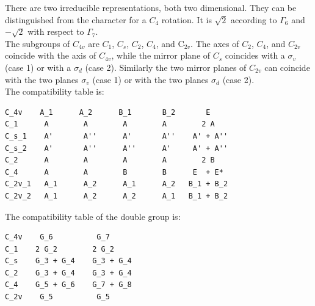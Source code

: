 \documentclass[12pt,a4paper]{article}
\begin{document}
There are two irreducible representations, both two dimensional. They can be
distinguished from the character for a $C_4$ rotation. It is
$\sqrt{2}$ according to $\Gamma_6$ and $-\sqrt{2}$ with respect to 
$\Gamma_7$. \\
The subgroups of $C_{4v}$ are $C_1$, $C_s$, $C_2$, $C_4$, and C$_{2v}$. 
The axes of $C_2$, $C_4$, and $C_{2v}$ coincide with the axis of $C_{4v}$, 
while the mirror plane of $C_s$ coincides with a $\sigma_v$ 
(case 1) or with a $\sigma_d$ (case 2). Similarly the two
mirror planes of $C_{2v}$ can coincide with the two planes $\sigma_v$ 
(case 1) or with the two planes $\sigma_d$ (case 2).\\
The compatibility table is:
\begin{verbatim}
C_4v    A_1      A_2      B_1       B_2       E
C_1      A        A        A        A        2 A
C_s_1    A'       A''      A'       A''    A' + A''
C_s_2    A'       A''      A''      A'     A' + A''
C_2      A        A        A        A        2 B
C_4      A        A        B        B      E  + E*   
C_2v_1   A_1      A_2      A_1      A_2   B_1 + B_2
C_2v_2   A_1      A_2      A_2      A_1   B_1 + B_2
\end{verbatim}
The compatibility table of the double group is:
\begin{verbatim}
C_4v    G_6          G_7  
C_1    2 G_2        2 G_2
C_s    G_3 + G_4    G_3 + G_4
C_2    G_3 + G_4    G_3 + G_4
C_4    G_5 + G_6    G_7 + G_8
C_2v    G_5          G_5
\end{verbatim}

\newpage
\end{document}

